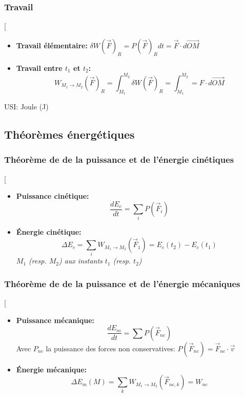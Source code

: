 \documentclass[12pt,hidelinks]{article}
\begin{document}
        \subsubsection{Travail}
            \begin{DashedDefinition}{}[
            \begin{itemize}
                \item \textbf{Travail élémentaire:} $\delta W (\vec F)_R = P(\vec F)_R dt = \vec F \cdot d \overrightarrow{OM}$
                \item \textbf{Travail entre $t_1$ et $t_2$:} \[W_{M_1 \rightarrow M_2}(\vec F)_R=\int_{M_1}^{M_2} \delta W(\vec F)_R=\int_{M_1}^{M_2} = F \cdot d \overrightarrow{OM}\]
            \end{itemize}
            USI: Joule (J)
            \end{DashedDefinition}
    \subsection{Théorèmes énergétiques}
        \subsubsection{Théorème de de la puissance et de l'énergie cinétiques}
            \begin{DashedDefinition}{}[
                \begin{itemize}
                    \item \textbf{Puissance cinétique:}
                    \[\frac{dE_c}{dt} = \sum_i P( \vec F_i)\]
                    \item \textbf{Énergie cinétique:}
                    \[\Delta E_c = \sum_i W_{M_1 \rightarrow M_2}(\vec F_1)=E_c(t_2)-E_c(t_1)\]
                    \textit{$M_1$ (resp. $M_2$) aux instants $t_1$ (resp. $t_2$)}
                \end{itemize}
            \end{DashedDefinition}
        \subsubsection{Théorème de de la puissance et de l'énergie mécaniques}
        \begin{DashedDefinition}{}[
            \begin{itemize}
                \item \textbf{Puissance mécanique:}
                \[\frac{dE_m}{dt}=\sum P(\vec F_{nc})\]
                Avec $P_{nc}$ la puissance des forces non conservatives: $P(\vec F_{nc})=\vec F_{nc} \cdot \vec v$
                \item \textbf{Énergie mécanique:}
                \[\Delta E_m(M)= \sum_k W_{M_1 \rightarrow M_2}(\vec F_{nc,k})=W_{nc}\]
            \end{itemize}
        \end{DashedDefinition}
\end{document}
